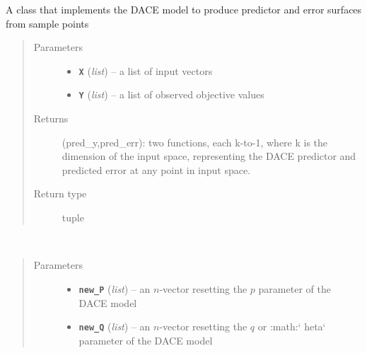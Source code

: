 \documentclass[letterpaper,10pt,english]{sphinxmanual}
\begin{document}
\begin{fulllineitems}
\label{index:smbo.models.dace}
A class that implements the DACE model to produce predictor and error surfaces from sample points
\begin{quote}\begin{description}
\item[{Parameters}] \leavevmode\begin{itemize}
\item {} 
\textbf{\texttt{X}} (\emph{list}) -- a list of input vectors

\item {} 
\textbf{\texttt{Y}} (\emph{list}) -- a list of observed objective values

\end{itemize}

\item[{Returns}] \leavevmode
(pred\_y,pred\_err): two functions, each k-to-1, where k is the dimension of the input space, representing the DACE predictor and predicted error at any point in input space.

\item[{Return type}] \leavevmode
tuple

\end{description}\end{quote}

\begin{fulllineitems}
\label{index:smbo.models.dace.conc_likelihood}~\begin{quote}\begin{description}
\item[{Parameters}] \leavevmode\begin{itemize}
\item {} 
\textbf{\texttt{new\_P}} (\emph{list}) -- an \(n\)-vector resetting the \(p\) parameter of the DACE model

\item {} 
\textbf{\texttt{new\_Q}} (\emph{list}) -- an \(n\)-vector resetting the \(q\) or :math:{}`        heta{}` parameter of the DACE model

\end{itemize}

\end{description}\end{quote}


\end{fulllineitems}
\end{fulllineitems}
\end{document}
